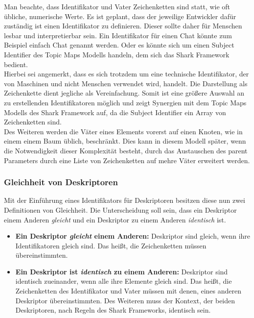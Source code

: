 \documentclass[a4paper]{article}
\begin{document}
	Man beachte, dass Identifikator und Vater Zeichenketten sind statt, wie
	oft übliche, numerische Werte. Es ist geplant, dass der jeweilige Entwickler
	dafür zuständig ist einen Identifikator zu definieren. Dieser sollte daher
	für Menschen lesbar und interpretierbar sein. Ein Identifikator für einen
	Chat könnte zum Beispiel einfach Chat genannt werden. Oder es könnte sich um
	einen Subject Identifier des Topic Maps Modells handeln, dem sich das Shark
	Framework bedient. \\
	
	Hierbei sei angemerkt, dass es sich trotzdem um eine technische Identifikator,
	der von Maschinen und nicht Menschen verwendet wird, handelt. Die Darstellung
	als Zeichenkette dient jegliche als Vereinfachung. Somit ist eine größere
	Auswahl an zu erstellenden Identifikatoren möglich und zeigt Synergien 
	mit dem Topic Maps Modells des Shark Framework auf, da die Subject Identifier
	ein Array von Zeichenketten sind. \\
	
	Des Weiteren werden die Väter eines Elements vorerst auf einen Knoten,
	wie in einem einem Baum üblich, beschränkt. Dies kann in diesem Modell später,
	wenn die Notwendigkeit dieser Komplexität besteht, durch das Austauschen des
	parent Parameters durch eine Liste von Zeichenketten auf mehre Väter erweitert
	werden.
	
	\subsubsection{Gleichheit von Deskriptoren}
	
	Mit der Einführung eines Identifikators für Deskriptoren besitzen
	diese nun zwei Definitionen von Gleichheit. Die Unterscheidung soll sein,
	dass ein Deskriptor einem Anderen \emph{gleicht} und ein Deskriptor zu
	einem Anderen \emph{identisch} ist.
	
	\begin{itemize}
		\item \textbf{Ein Deskriptor \emph{gleicht} einem Anderen:} Deskriptor
		sind gleich, wenn ihre Identifikatoren gleich sind. Das heißt, die
		Zeichenketten müssen übereinstimmten.
		\item \textbf{Ein Deskriptor ist \emph{identisch} zu einem Anderen:}
		Deskriptor sind identisch zueinander, wenn alle ihre Elemente gleich sind.
		Das heißt, die Zeichenketten des Identifikator und Vater müssen mit denen,
		eines anderen Deskriptor übereinstimmten. Des Weiteren muss der Kontext,
		der beiden Deskriptoren, nach Regeln des Shark Frameworks, identisch sein.
	\end{itemize} 	
	
\end{document}

